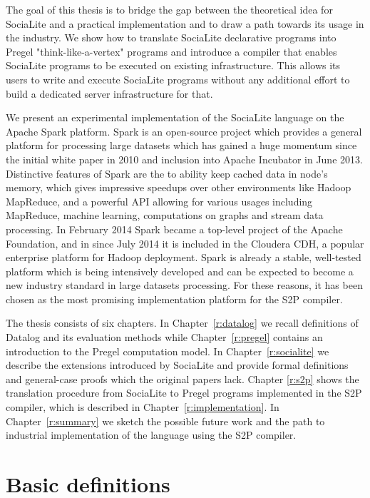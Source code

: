 The goal of this thesis is to bridge the gap between the theoretical idea for SociaLite and a practical implementation and to draw a path towards its usage in the industry. We show how to translate SociaLite declarative programs into Pregel "think-like-a-vertex" programs and introduce a compiler that enables SociaLite programs to be executed on existing infrastructure. This allows its users to write and execute SociaLite programs without any additional effort to build a dedicated server infrastructure for that.

We present an experimental implementation of the SociaLite language on the Apache Spark platform. Spark \cite{spark2} is an open-source project which provides a general platform for processing large datasets which has gained a huge momentum since the initial white paper in 2010 \cite{spark} and inclusion into Apache Incubator in June 2013. Distinctive features of Spark are the to ability keep cached data in node's memory, which gives impressive speedups over other environments like Hadoop MapReduce, and a powerful API allowing for various usages including MapReduce, machine learning, computations on graphs and stream data processing. In February 2014 Spark became a top-level project of the Apache Foundation, and in since July 2014 it is included in the Cloudera CDH, a popular enterprise platform for Hadoop deployment. Spark is already a stable, well-tested platform which is being intensively developed and can be expected to become a new industry standard in large datasets processing. For these reasons, it has been chosen as the most promising implementation platform for the S2P compiler.

The thesis consists of six chapters. In Chapter~\ref{r:datalog} we recall definitions of Datalog and its evaluation methods while Chapter~\ref{r:pregel} contains an introduction to the Pregel computation model. In Chapter~\ref{r:socialite} we describe the extensions introduced by SociaLite and provide formal definitions and general-case proofs which the original papers lack. Chapter \ref{r:s2p} shows the translation procedure from SociaLite to Pregel programs implemented in the S2P compiler, which is described in Chapter~\ref{r:implementation}. In Chapter~\ref{r:summary} we sketch the possible future work and the path to industrial implementation of the language using the S2P compiler.

\section{Basic definitions}\label{r:basicdefs}

